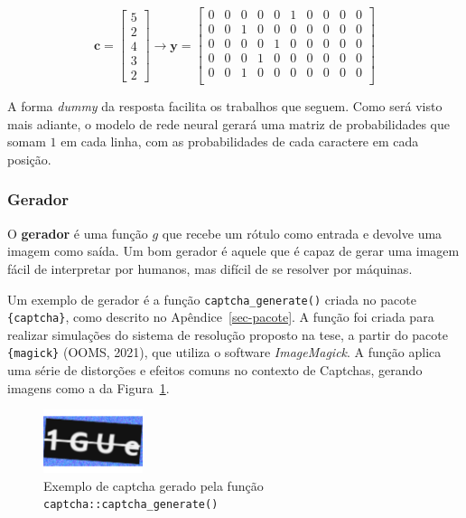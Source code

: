 \documentclass[12pt,twoside,brazilian]{book}
\begin{document}
\[
\mathbf c = \left[\begin{array}{c}
     5  \\
     2 \\
     4 \\
     3 \\
     2
\end{array}\right] \rightarrow \mathbf{y} = \left[\begin{array}{cccccccccc}
    0 & 0 & 0 & 0 & 0 & 1 & 0 & 0 & 0 & 0 \\
    0 & 0 & 1 & 0 & 0 & 0 & 0 & 0 & 0 & 0 \\
    0 & 0 & 0 & 0 & 1 & 0 & 0 & 0 & 0 & 0 \\
    0 & 0 & 0 & 1 & 0 & 0 & 0 & 0 & 0 & 0 \\
    0 & 0 & 1 & 0 & 0 & 0 & 0 & 0 & 0 & 0 \\
\end{array}\right]
\]

A forma \emph{dummy} da resposta facilita os trabalhos que seguem. Como
será visto mais adiante, o modelo de rede neural gerará uma matriz de
probabilidades que somam \(1\) em cada linha, com as probabilidades de
cada caractere em cada posição.

\hypertarget{gerador}{%
\subsubsection{Gerador}\label{gerador}}

O \textbf{gerador} é uma função \(g\) que recebe um rótulo como entrada
e devolve uma imagem como saída. Um bom gerador é aquele que é capaz de
gerar uma imagem fácil de interpretar por humanos, mas difícil de se
resolver por máquinas.

Um exemplo de gerador é a função \texttt{captcha\_generate()} criada no
pacote \texttt{\{captcha\}}, como descrito no Apêndice~\ref{sec-pacote}.
A função foi criada para realizar simulações do sistema de resolução
proposto na tese, a partir do pacote \texttt{\{magick\}} (OOMS, 2021),
que utiliza o software \emph{ImageMagick}. A função aplica uma série de
distorções e efeitos comuns no contexto de Captchas, gerando imagens
como a da Figura~\ref{fig-captcha-r-exemplo}.

\begin{figure}

{\centering \includegraphics[width=1.14583in,height=\textheight]{./metodologia_files/figure-pdf/fig-captcha-r-exemplo-1.pdf}

}

\caption{\label{fig-captcha-r-exemplo}Exemplo de captcha gerado pela
função \texttt{captcha::captcha\_generate()}}

\end{figure}
\end{document}

